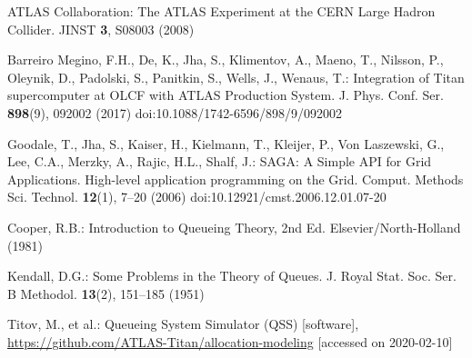 ATLAS Collaboration: The ATLAS Experiment at the CERN Large Hadron Collider. JINST \textbf{3}, S08003 (2008)

Barreiro Megino, F.H., De, K., Jha, S., Klimentov, A., Maeno, T., Nilsson, P., Oleynik, D., Padolski, S., Panitkin, S., Wells, J., Wenaus, T.: Integration of Titan supercomputer at OLCF with ATLAS Production System. J. Phys. Conf. Ser. \textbf{898}(9), 092002 (2017) doi:10.1088/1742-6596/898/9/092002

Goodale, T., Jha, S., Kaiser, H., Kielmann, T., Kleijer, P., Von Laszewski, G., Lee, C.A., Merzky, A., Rajic, H.L., Shalf, J.: SAGA: A Simple API for Grid Applications. High-level application programming on the Grid. Comput. Methods Sci. Technol. \textbf{12}(1), 7--20 (2006) doi:10.12921/cmst.2006.12.01.07-20

Cooper, R.B.: Introduction to Queueing Theory, 2nd Ed. Elsevier/North-Holland (1981)

Kendall, D.G.: Some Problems in the Theory of Queues. J. Royal Stat. Soc. Ser. B Methodol. \textbf{13}(2), 151--185 (1951)

Titov, M., et al.: Queueing System Simulator (QSS) [software], \url{https://github.com/ATLAS-Titan/allocation-modeling} [accessed on 2020-02-10]


